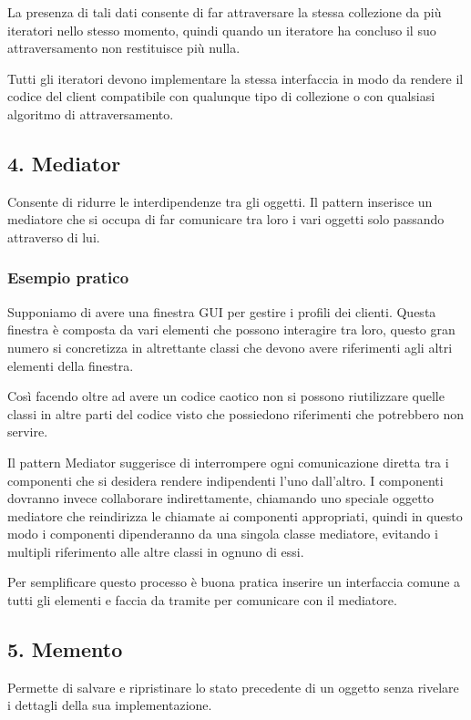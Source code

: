 \documentclass{report}
\begin{document}
\noindent
La presenza di tali dati consente di far attraversare la stessa collezione da più iteratori nello stesso momento, quindi quando un iteratore ha concluso il suo attraversamento non restituisce più nulla.

\noindent
Tutti gli iteratori devono implementare la stessa interfaccia in modo da rendere il codice del client compatibile con qualunque tipo di collezione o con qualsiasi algoritmo di attraversamento.

\subsection*{4. Mediator}
Consente di ridurre le interdipendenze tra gli oggetti. Il pattern inserisce un mediatore che si occupa di far comunicare tra loro i vari oggetti solo passando attraverso di lui.

\subsubsection*{Esempio pratico}
Supponiamo di avere una finestra GUI per gestire i profili dei clienti. Questa finestra è composta da vari elementi che possono interagire tra loro, questo gran numero si concretizza in altrettante classi che devono avere riferimenti agli altri elementi della finestra.

\noindent
Così facendo oltre ad avere un codice caotico non si possono riutilizzare quelle classi in altre parti del codice visto che possiedono riferimenti che potrebbero non servire.

\medskip
\noindent
Il pattern Mediator suggerisce di interrompere ogni comunicazione diretta tra i componenti che si desidera rendere indipendenti l'uno dall'altro. I componenti dovranno invece collaborare indirettamente, chiamando uno speciale oggetto mediatore che reindirizza le chiamate ai componenti appropriati, quindi in questo modo i componenti dipenderanno da una singola classe mediatore, evitando i multipli riferimento alle altre classi in ognuno di essi.

\noindent
Per semplificare questo processo è buona pratica inserire un interfaccia comune a tutti gli elementi e faccia da tramite per comunicare con il mediatore.

\subsection*{5. Memento}
Permette di salvare e ripristinare lo stato precedente di un oggetto senza rivelare i dettagli della sua implementazione.
\end{document}
